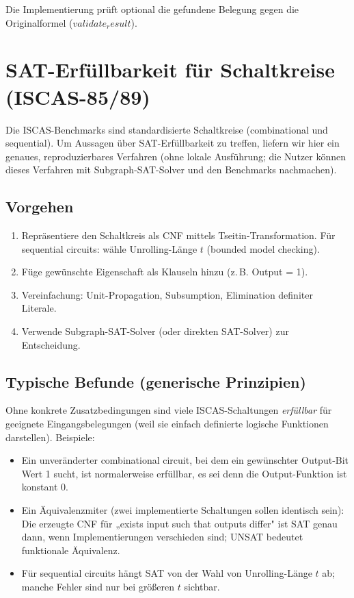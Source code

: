 \documentclass[a4paper,12pt]{article}
\theoremstyle{definition}
\begin{document}
Die Implementierung prüft optional die gefundene Belegung gegen die Originalformel ($validate_result$).

\section{SAT-Erfüllbarkeit für Schaltkreise (ISCAS-85/89)}
\label{ch:iscas}

Die ISCAS-Benchmarks sind standardisierte Schaltkreise (combinational und sequential). Um Aussagen über SAT-Erfüllbarkeit zu treffen, liefern wir hier ein genaues, reproduzierbares Verfahren (ohne lokale Ausführung; die Nutzer können dieses Verfahren mit Subgraph-SAT-Solver und den Benchmarks nachmachen).

\subsection{Vorgehen}
\begin{enumerate}
  \item Repräsentiere den Schaltkreis als CNF mittels Tseitin-Transformation. Für sequential circuits: wähle Unrolling-Länge $t$ (bounded model checking).
  \item Füge gewünschte Eigenschaft als Klauseln hinzu (z.\,B. Output = 1).
  \item Vereinfachung: Unit-Propagation, Subsumption, Elimination definiter Literale.
  \item Verwende Subgraph-SAT-Solver (oder direkten SAT-Solver) zur Entscheidung.
\end{enumerate}

\subsection{Typische Befunde (generische Prinzipien)}
Ohne konkrete Zusatzbedingungen sind viele ISCAS-Schaltungen \emph{erfüllbar} für geeignete Eingangsbelegungen (weil sie einfach definierte logische Funktionen darstellen). Beispiele:
\begin{itemize}
  \item Ein unveränderter combinational circuit, bei dem ein gewünschter Output-Bit Wert 1 sucht, ist normalerweise erfüllbar, es sei denn die Output-Funktion ist konstant 0.
  \item Ein Äquivalenzmiter (zwei implementierte Schaltungen sollen identisch sein): Die erzeugte CNF für „exists input such that outputs differ" ist SAT genau dann, wenn Implementierungen verschieden sind; UNSAT bedeutet funktionale Äquivalenz.
  \item Für sequential circuits hängt SAT von der Wahl von Unrolling-Länge $t$ ab; manche Fehler sind nur bei größeren $t$ sichtbar.
\end{itemize}
\end{document}
